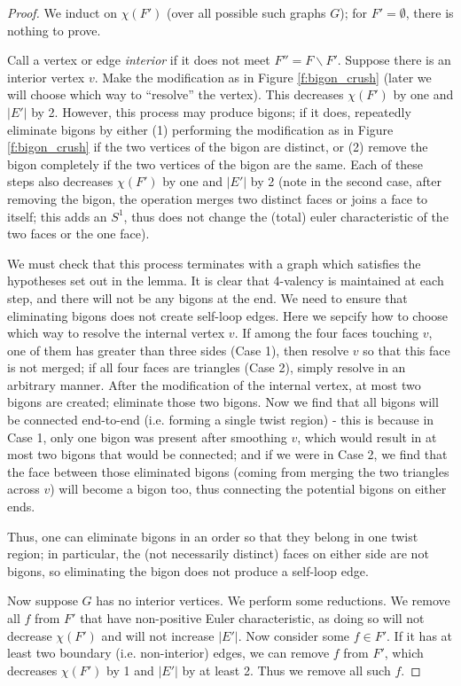 \documentclass[11pt]{amsart}
\theoremstyle{plain}
\theoremstyle{definition}
\begin{document}
\begin{proof}
We induct on $\chi(F')$ (over all possible such graphs $G$);
for $F' = \emptyset$, there is nothing to prove.

Call a vertex or edge \emph{interior} if it does not meet
$F'' = F \backslash F'$.
Suppose there is an interior vertex $v$.
Make the modification as in Figure \ref{f:bigon_crush}
(later we will choose which way to ``resolve'' the vertex).
This decreases $\chi(F')$ by one and $|E'|$ by 2.
However, this process may produce bigons;
if it does, repeatedly eliminate bigons by either
(1) performing the modification as in Figure \ref{f:bigon_crush}
if the two vertices of the bigon are distinct,
or (2) remove the bigon completely if the two vertices
of the bigon are the same.
Each of these steps also decreases $\chi(F')$ by one and $|E'|$ by 2
(note in the second case, after removing the bigon,
the operation merges two distinct faces or joins a face to itself;
this adds an $S^1$, thus does not change the (total) euler characteristic
of the two faces or the one face).


We must check that this process terminates with a graph
which satisfies the hypotheses set out in the lemma.
It is clear that %
4-valency is maintained
at each step, and there will not be any bigons at the end.
We need to ensure that eliminating bigons does not
create self-loop edges.
Here we sepcify how to choose which way to resolve the internal
vertex $v$. If among the four faces touching $v$,
one of them has greater than three sides (Case 1),
then resolve $v$ so that this face is not merged;
if all four faces are triangles (Case 2),
simply resolve in an arbitrary manner.
After the modification of the internal vertex,
at most two bigons are created;
eliminate those two bigons.
Now we find that all bigons will be connected end-to-end
(i.e. forming a single twist region) -
this is because in Case 1, only one bigon was present after smoothing
$v$, which would result in at most two bigons that would be connected;
and if we were in Case 2, we find that the face between those
eliminated bigons (coming from merging the two triangles across $v$)
will become a bigon too,
thus connecting the potential bigons on either ends.

Thus, one can eliminate bigons in an order so that
they belong in one twist region;
in particular, the (not necessarily distinct) faces on either side
are not bigons,
so eliminating the bigon does not produce a self-loop edge.


Now suppose $G$ has no interior vertices.
We perform some reductions.
We remove all $f$ from $F'$ that have non-positive Euler characteristic,
as doing so will not decrease $\chi(F')$ and will not increase $|E'|$.
Now consider some $f\in F'$.
If it has at least two boundary (i.e. non-interior) edges,
we can remove $f$ from $F'$,
which decreases $\chi(F')$ by 1 and $|E'|$ by at least 2.
Thus we remove all such $f$.



\end{proof}
\end{document}

